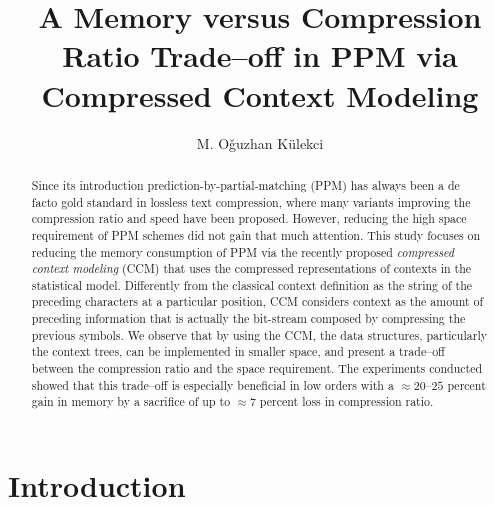 \documentclass[runningheads,a4paper]{llncs}
\begin{document}
\mainmatter  

\title{A Memory versus Compression Ratio Trade--off  in {PPM} via Compressed Context Modeling}




\author{M. O\v{g}uzhan K\"{u}lekci 
}




\maketitle

\sloppy

\begin{abstract}
Since its introduction prediction-by-partial-matching (PPM) has always been a de facto gold standard in lossless text
compression, where many variants improving the compression ratio and speed have been proposed. 
However, reducing the high space requirement of PPM schemes did not gain that much attention.
This study focuses on reducing the memory consumption of {PPM} via the recently proposed
\emph{compressed context modeling} (CCM) that uses the compressed representations of contexts in the
statistical model. 
Differently from the classical context definition  as the string  of the preceding characters at a particular position,
CCM considers context as the  amount of preceding information that is actually the bit-stream composed by compressing
the previous symbols.  
We observe that by using the {CCM}, the data structures, particularly the context trees, can be implemented in smaller
space, and present a trade--off between the compression ratio and the space requirement. The experiments conducted
showed that this trade--off is especially beneficial in low orders with a  $\approx 20$--$25$ percent gain
in memory by a sacrifice of up to $\approx 7$ percent loss in compression ratio. 
\end{abstract}

\section{Introduction}
\end{document}
